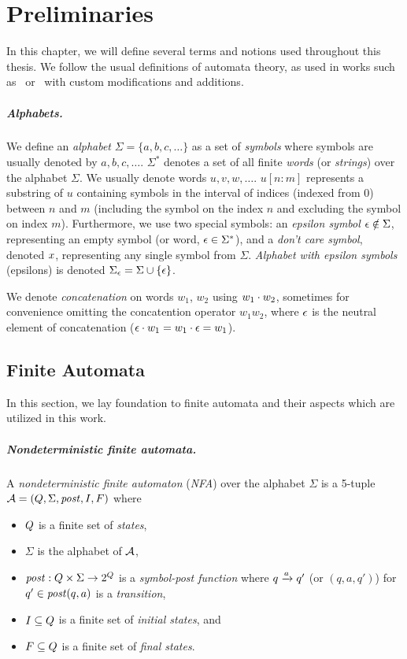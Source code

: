 \chapter{Preliminaries}
\label{sec:Preliminaries}
In this chapter, we will define several terms and notions used throughout this thesis.
We follow the usual definitions of automata theory, as used in works such as~\cite{Esparza} or~\cite{Sipser} with custom modifications and additions.

\paragraph{Alphabets.}
We define an \emph{alphabet} $\Sigma = \{ a, b, c, \ldots \}$ as a set of \emph{symbols} where
symbols are usually denoted by $a, b, c, \ldots$.
$\Sigma^*$ denotes a set of all finite \emph{words} (or \emph{strings}) over the alphabet $\Sigma$.
We usually denote words $u, v, w, \ldots$.
$u[n:m]$ represents a substring of $u$ containing symbols in the interval of indices (indexed from 0) between $n$ and $m$ (including the symbol on the index $n$ and excluding the symbol on index $m$).
Furthermore, we use two special symbols: an \emph{epsilon symbol} $\epsilon \notin \Sigma$, representing an empty symbol (or word, $\epsilon \in \Sigma^*$), and a \emph{don't care symbol}, denoted $x$, representing any single symbol from $\Sigma$.
\emph{Alphabet with epsilon symbols} (epsilons) is denoted $\Sigma_\epsilon = \Sigma \cup \{ \epsilon \}$.

We denote \emph{concatenation} on words $w_1$, $w_2$ using $w_1 \cdot w_2$, sometimes for convenience omitting the concatention operator $w_1w_2$, where $\epsilon$ is the neutral element of concatenation ($\epsilon \cdot w_1 = w_1 \cdot \epsilon = w_1$).

\section{Finite Automata}

In this section, we lay foundation to finite automata and their aspects which are utilized in this work.

\paragraph{Nondeterministic finite automata.}
A \emph{nondeterministic finite automaton} (\emph{NFA}) over the alphabet $\Sigma$ is a 5-tuple $\mathcal{A} = (Q, \Sigma, \mathit{post}, I, F)$ where
\begin{itemize}
    \item $Q$ is a finite set of \emph{states},
    \item $\Sigma$ is the alphabet of $\mathcal{A}$,
    \item $\mathit{post}: Q \times \Sigma \rightarrow 2^{Q}$ is a \emph{symbol-post function} where ${q} \xrightarrow{{a}} {q'}$ (or $(q, a, q')$) for $q' \in \mathit{post}(q, a)$ is a \emph{transition},
    \item $I \subseteq Q$ is a finite set of \emph{initial states}, and
    \item $F \subseteq Q$ is a finite set of \emph{final states}.
\end{itemize}

